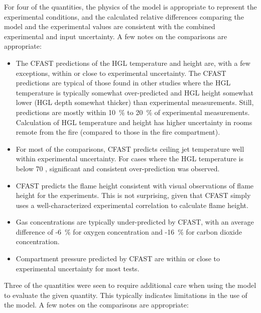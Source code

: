 For four of the quantities,  the physics of the model is appropriate to represent the experimental conditions, and the calculated relative differences comparing the model and the experimental values are consistent with the combined experimental and input uncertainty.  A few notes on the comparisons are appropriate:

\begin{itemize}
\item The CFAST predictions of the HGL temperature and height are, with a few exceptions, within or close to experimental uncertainty.  The CFAST predictions are typical of those found in other studies where the HGL temperature is typically somewhat over-predicted and HGL height somewhat lower (HGL depth somewhat thicker) than experimental measurements.  Still, predictions are mostly within 10~\% to 20~\% of experimental measurements.  Calculation of HGL temperature and height has higher uncertainty in rooms remote from the fire (compared to those in the fire compartment).
\item For most of the comparisons, CFAST predicts ceiling jet temperature well within experimental uncertainty.  For cases where the HGL temperature is below 70 \degc, significant and consistent over-prediction was observed.
\item CFAST predicts the flame height consistent with visual observations of flame height for the experiments.  This is not surprising, given that CFAST simply uses a well-characterized experimental correlation to calculate flame height.
\item Gas concentrations are typically under-predicted by CFAST, with an average difference of -6~\% for oxygen concentration and -16~\% for carbon dioxide concentration. 
\item Compartment pressure predicted by CFAST are within or close to experimental uncertainty for most tests.
\end{itemize}


Three of the quantities were seen to require additional care when using the model to evaluate the given quantity.  This typically indicates limitations in the use of the model.  A few notes on the comparisons are appropriate:

